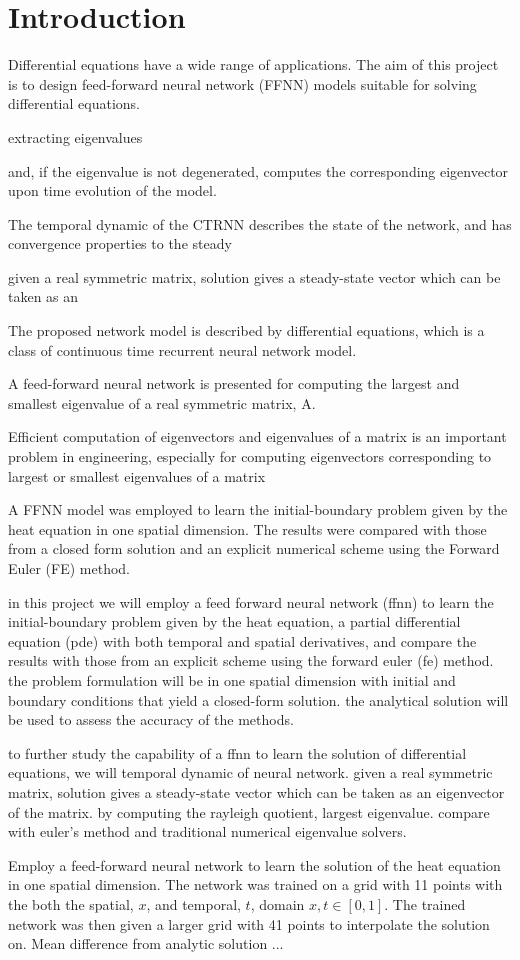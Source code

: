 \section{Introduction}\label{sec:Introduction}

Differential equations have a wide range of applications. The aim of this project is to design feed-forward neural network (FFNN) models suitable for solving differential equations. 

extracting eigenvalues


and, if the eigenvalue is not degenerated, computes the corresponding eigenvector upon time evolution of the model. 

The temporal dynamic of the CTRNN describes the state of the network, and has convergence properties to the steady  

given a real symmetric matrix, solution gives a steady-state vector which can be taken as an

The proposed network model is described by differential equations, which is a class of continuous time recurrent neural network model. 

A feed-forward neural network is presented for computing the largest and smallest eigenvalue of a real symmetric matrix, A.


Efficient computation of eigenvectors and eigenvalues of a matrix is an important problem in engineering, especially for computing eigenvectors corresponding to largest or smallest eigenvalues of a matrix

A FFNN model was employed to learn the initial-boundary problem given by the heat equation in one spatial dimension. The results were compared with those from a closed form solution and an explicit numerical scheme using the Forward Euler (FE) method.

in this project we will employ a feed forward neural network (ffnn) to learn the initial-boundary problem given by the heat equation, a partial differential equation (pde) with both temporal and spatial derivatives, and compare the results with those from an explicit scheme using the forward euler (fe) method. the problem formulation will be in one spatial dimension with initial and boundary conditions that yield a closed-form solution. the analytical solution will be used to assess the accuracy of the methods. 

to further study the capability of a ffnn to learn the solution of differential equations, we will 
temporal dynamic of neural network. given a real symmetric matrix, solution gives a steady-state vector which can be taken as an eigenvector of the matrix. by computing the rayleigh quotient, largest eigenvalue.
compare with euler's method and traditional numerical eigenvalue solvers.


Employ a feed-forward neural network to learn the solution of the heat equation in one spatial dimension. The network was trained on a grid with 11 points with the both the spatial, $x$, and temporal, $t$, domain $x, t \in [0,1]$. The trained network was then given a larger grid with 41 points to interpolate the solution on. Mean difference from analytic solution ...


